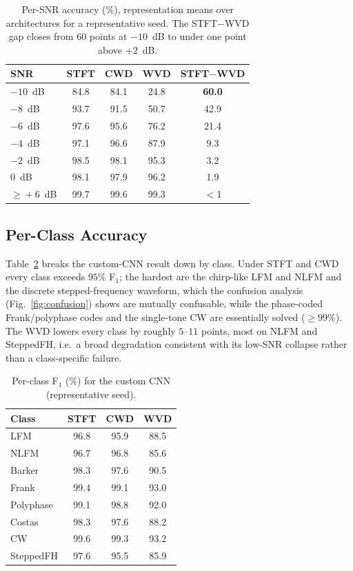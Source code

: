 \documentclass[journal]{IEEEtran}
\begin{document}
\begin{table}[t]
\centering
\caption{Per-SNR accuracy (\%), representation means over architectures for a
representative seed. The STFT$-$WVD gap closes from 60 points at $-10$~dB to under
one point above $+2$~dB.}
\label{tab:lowsnr}
\begin{tabular}{@{}lcccc@{}}
\toprule
SNR & STFT & CWD & WVD & STFT$-$WVD \\
\midrule
$-10$~dB & 84.8 & 84.1 & 24.8 & \textbf{60.0} \\
$-8$~dB  & 93.7 & 91.5 & 50.7 & 42.9 \\
$-6$~dB  & 97.6 & 95.6 & 76.2 & 21.4 \\
$-4$~dB  & 97.1 & 96.6 & 87.9 & 9.3 \\
$-2$~dB  & 98.5 & 98.1 & 95.3 & 3.2 \\
$0$~dB   & 98.1 & 97.9 & 96.2 & 1.9 \\
$\geq\!+6$~dB & 99.7 & 99.6 & 99.3 & $<$1 \\
\bottomrule
\end{tabular}
\end{table}

\subsection{Per-Class Accuracy}
Table~\ref{tab:perclass} breaks the custom-CNN result down by class. Under STFT and
CWD every class exceeds $95\%$ F$_1$; the hardest are the chirp-like LFM and NLFM
and the discrete stepped-frequency waveform, which the confusion analysis
(Fig.~\ref{fig:confusion}) shows are mutually confusable, while the phase-coded
Frank/polyphase codes and the single-tone CW are essentially solved ($\geq99\%$).
The WVD lowers every class by roughly $5$--$11$ points, most on NLFM and SteppedFH,
i.e.\ a broad degradation consistent with its low-SNR collapse rather than a
class-specific failure.

\begin{table}[t]
\centering
\caption{Per-class F$_1$ (\%) for the custom CNN (representative seed).}
\label{tab:perclass}
\begin{tabular}{@{}lccc@{}}
\toprule
Class & STFT & CWD & WVD \\
\midrule
LFM       & 96.8 & 95.9 & 88.5 \\
NLFM      & 96.7 & 96.8 & 85.6 \\
Barker    & 98.3 & 97.6 & 90.5 \\
Frank     & 99.4 & 99.1 & 93.0 \\
Polyphase & 99.1 & 98.8 & 92.0 \\
Costas    & 98.3 & 97.6 & 88.2 \\
CW        & 99.6 & 99.3 & 93.2 \\
SteppedFH & 97.6 & 95.5 & 85.9 \\
\bottomrule
\end{tabular}
\end{table}
\end{document}
